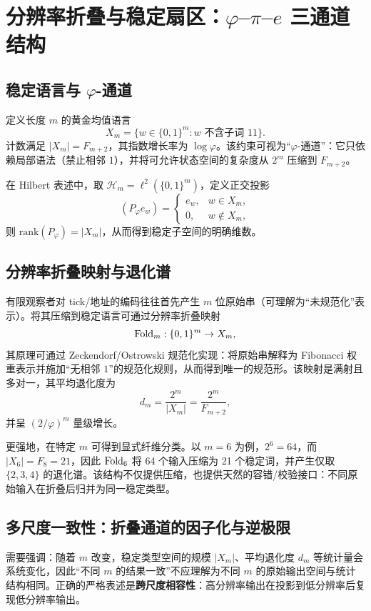 \section{分辨率折叠与稳定扇区：\texorpdfstring{$\varphi$--$\pi$--$e$}{varphi-pi-e} 三通道结构}

\subsection{稳定语言与 \texorpdfstring{$\varphi$}{varphi}-通道}

定义长度 $m$ 的黄金均值语言
\[
X_m=\{w\in\{0,1\}^m:\text{$w$ 不含子词 }11\}.
\]
计数满足 $|X_m|=F_{m+2}$，其指数增长率为 $\log\varphi$。该约束可视为“$\varphi$-通道”：它只依赖局部语法（禁止相邻 $1$），并将可允许状态空间的复杂度从 $2^m$ 压缩到 $F_{m+2}$。

在 Hilbert 表述中，取 $\mathcal{H}_m=\ell^2(\{0,1\}^m)$，定义正交投影
\[
(P_\varphi e_w)=
\begin{cases}
e_w,&w\in X_m,\\
0,&w\notin X_m,
\end{cases}
\]
则 $\mathrm{rank}(P_\varphi)=|X_m|$，从而得到稳定子空间的明确维数。

\subsection{分辨率折叠映射与退化谱}

有限观察者对 tick/地址的编码往往首先产生 $m$ 位原始串（可理解为“未规范化”表示）。将其压缩到稳定语言可通过分辨率折叠映射
\[
\mathrm{Fold}_m:\{0,1\}^m\to X_m,
\]
其原理可通过 Zeckendorf/Ostrowski 规范化实现：将原始串解释为 Fibonacci 权重表示并施加“无相邻 $1$”的规范化规则，从而得到唯一的规范形。该映射是满射且多对一，其平均退化度为
\[
d_m=\frac{2^m}{|X_m|}=\frac{2^m}{F_{m+2}},
\]
并呈 $(2/\varphi)^m$ 量级增长。

更强地，在特定 $m$ 可得到显式纤维分类。以 $m=6$ 为例，$2^6=64$，而 $|X_6|=F_8=21$，因此 $\mathrm{Fold}_6$ 将 64 个输入压缩为 21 个稳定词，并产生仅取 $\{2,3,4\}$ 的退化谱。该结构不仅提供压缩，也提供天然的容错/校验接口：不同原始输入在折叠后归并为同一稳定类型。

\subsection{多尺度一致性：折叠通道的因子化与逆极限}

需要强调：随着 $m$ 改变，稳定类型空间的规模 $|X_m|$、平均退化度 $d_m$ 等统计量会系统变化，因此“不同 $m$ 的结果一致”不应理解为不同 $m$ 的原始输出空间与统计结构相同。正确的严格表述是\textbf{跨尺度相容性}：高分辨率输出在投影到低分辨率后复现低分辨率输出。

